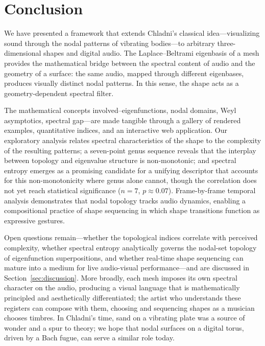 \documentclass[]{interact}
\theoremstyle{plain}
\theoremstyle{definition}
\theoremstyle{remark}
\begin{document}
\section{Conclusion}
\label{sec:conclusion}

We have presented a framework that extends Chladni's classical idea---visualizing sound through the nodal patterns of vibrating bodies---to arbitrary three-dimensional shapes and digital audio. The Laplace--Beltrami eigenbasis of a mesh provides the mathematical bridge between the spectral content of audio and the geometry of a surface: the same audio, mapped through different eigenbases, produces visually distinct nodal patterns. In this sense, the shape acts as a geometry-dependent spectral filter.

The mathematical concepts involved--eigenfunctions, nodal domains, Weyl asymptotics, spectral gap---are made tangible through a gallery of rendered examples, quantitative indices, and an interactive web application. Our exploratory analysis relates spectral characteristics of the shape to the complexity of the resulting patterns; a seven-point genus sequence reveals that the interplay between topology and eigenvalue structure is non-monotonic; and spectral entropy emerges as a promising candidate for a unifying descriptor that accounts for this non-monotonicity where genus alone cannot, though the correlation does not yet reach statistical significance ($n=7$, $p\approx0.07$). Frame-by-frame temporal analysis demonstrates that nodal topology tracks audio dynamics, enabling a compositional practice of shape sequencing in which shape transitions function as expressive gestures.

Open questions remain---whether the topological indices correlate with perceived complexity, whether spectral entropy analytically governs the nodal-set topology of eigenfunction superpositions, and whether real-time shape sequencing can mature into a medium for live audio-visual performance---and are discussed in Section~\ref{sec:discussion}. More broadly, each mesh imposes its own spectral character on the audio, producing a visual language that is mathematically principled and aesthetically differentiated; the artist who understands these registers can compose with them, choosing and sequencing shapes as a musician chooses timbres. In Chladni's time, sand on a vibrating plate was a source of wonder and a spur to theory; we hope that nodal surfaces on a digital torus, driven by a Bach fugue, can serve a similar role today.
\end{document}
